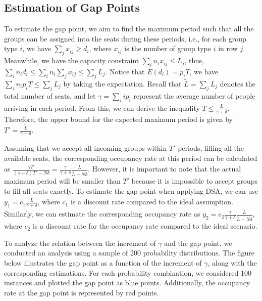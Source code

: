 \subsection{Estimation of Gap Points}
To estimate the gap point, we aim to find the maximum period such that all the groups can be assigned into the seats during these periods, i.e., for each group type $i$, we have $\sum_{j} x_{ij} \geq d_i$, where $x_{ij}$ is the number of group type $i$ in row $j$. Meanwhile, we have the capacity constraint $\sum_{i} n_{i} x_{ij} \leq L_j$, thus, $\sum_{i} n_i d_i \leq \sum_{i} n_i \sum_{j} x_{ij} \leq \sum_{j} L_{j}$. Notice that $E(d_i) = p_i T$, we have $\sum_{i} n_i p_i T \leq \sum_{j} L_{j}$ by taking the expectation. Recall that $\tilde{L} = \sum_{j} L_{j}$ denotes the total number of seats, and let $\gamma = \sum_{i} i p_i$ represent the average number of people arriving in each period. From this, we can derive the inequality $T \leq \frac{\tilde{L}}{\gamma + \delta}$. Therefore, the upper bound for the expected maximum period is given by $T' = \frac{\tilde{L}}{\gamma + \delta}$.


Assuming that we accept all incoming groups within $T'$ periods, filling all the available seats, the corresponding occupancy rate at this period can be calculated as $\frac{\gamma T'}{(\gamma+ \delta)T' - N \delta} = \frac{\gamma}{\gamma +\delta} \frac{\tilde{L}}{\tilde{L}-N \delta}$. However, it is important to note that the actual maximum period will be smaller than $T{'}$ because it is impossible to accept groups to fill all seats exactly. To estimate the gap point when applying DSA, we can use $y_1 = c_1 \frac{\tilde{L}}{\gamma + \delta}$, where $c_1$ is a discount rate compared to the ideal assumption. Similarly, we can estimate the corresponding occupancy rate as $y_2 = c_2 \frac{\gamma}{\gamma +\delta} \frac{\tilde{L}}{\tilde{L}-N \delta}$, where $c_2$ is a discount rate for the occupancy rate compared to the ideal scenario.

To analyze the relation between the increment of $\gamma$ and the gap point, we conducted an analysis using a sample of 200 probability distributions. The figure below illustrates the gap point as a function of the increment of $\gamma$, along with the corresponding estimations. For each probability combination, we considered 100 instances and plotted the gap point as blue points. Additionally, the occupancy rate at the gap point is represented by red points.


